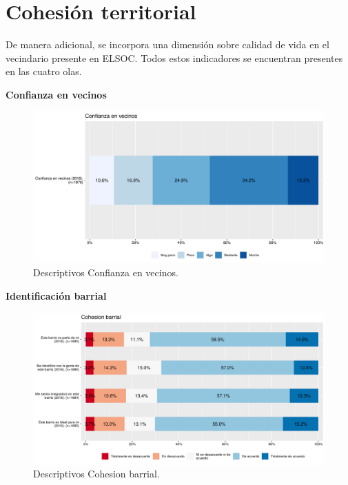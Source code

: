 \documentclass[
  12pt,
]{book}
\begin{document}
\hypertarget{cohesiuxf3n-territorial}{%
\section{Cohesión territorial}\label{cohesiuxf3n-territorial}}

De manera adicional, se incorpora una dimensión sobre calidad de vida en el vecindario presente en ELSOC. Todos estos indicadores se encuentran presentes en las cuatro olas.

\textbf{Confianza en vecinos}

\begin{figure}[H]

{\centering \includegraphics[width=1\linewidth,height=1\textheight]{output/graphs/confianza-vecinos} 

}

\caption{Descriptivos Confianza en vecinos.}\label{fig:unnamed-chunk-3}
\end{figure}

\textbf{Identificación barrial}

\begin{figure}[H]

{\centering \includegraphics[width=1\linewidth,height=1\textheight]{output/graphs/cohesion-barrial} 

}

\caption{Descriptivos Cohesion barrial.}\label{fig:unnamed-chunk-4}
\end{figure}
\end{document}
